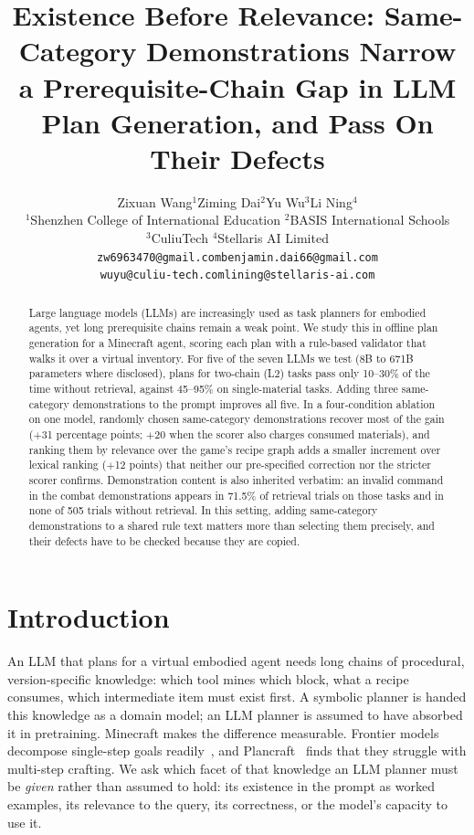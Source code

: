 \documentclass[letterpaper]{article} %
\title{Existence Before Relevance: Same-Category Demonstrations Narrow a
       Prerequisite-Chain Gap in LLM Plan Generation, and Pass On Their Defects}
\author{%
  Zixuan Wang$^{1}$\quad Ziming Dai$^{2}$\quad Yu Wu$^{3}$\quad Li Ning$^{4}$ \\
  $^{1}$Shenzhen College of International Education\quad
  $^{2}$BASIS International Schools \\
  $^{3}$CuliuTech\quad
  $^{4}$Stellaris AI Limited \\
  \texttt{\small zw6963470@gmail.com}\quad \texttt{\small benjamin.dai66@gmail.com} \\
  \texttt{\small wuyu@culiu-tech.com}\quad \texttt{\small lining@stellaris-ai.com}
}
\begin{document}
\maketitle

\begin{abstract}
Large language models (LLMs) are increasingly used as task planners for
embodied agents, yet long prerequisite chains remain a weak point.  We study
this in offline plan generation for a Minecraft agent, scoring each plan with
a rule-based validator that walks it over a virtual inventory.  For five of
the seven LLMs we test (8B to 671B parameters where disclosed), plans for
two-chain (L2) tasks pass only 10--30\% of the time without retrieval, against
45--95\% on single-material tasks.  Adding three same-category demonstrations
to the prompt improves all five.  In a four-condition ablation on one model,
randomly chosen same-category demonstrations recover most of the gain ($+$31
percentage points; $+$20 when the scorer also charges consumed materials), and
ranking them by relevance over the game's recipe graph adds a smaller increment
over lexical ranking ($+$12 points) that neither our pre-specified correction
nor the stricter scorer confirms.  Demonstration content is also inherited
verbatim: an invalid command in the combat demonstrations appears in 71.5\% of
retrieval trials on those tasks and in none of 505 trials without retrieval.
In this setting, adding same-category demonstrations to a shared rule text
matters more than selecting them precisely, and their defects have to be
checked because they are copied.
\end{abstract}

\section{Introduction}
\label{sec:intro}

An LLM that plans for a virtual embodied agent needs long chains of
procedural, version-specific knowledge:
which tool mines which block, what a recipe consumes, which intermediate item
must exist first.  A symbolic planner is handed this knowledge as a domain
model; an LLM planner is assumed to have absorbed it in pretraining.
Minecraft makes the difference measurable.  Frontier models decompose
single-step goals readily~\citep{wang2023voyager,wang2023describe}, and
Plancraft~\citep{dagan2024plancraft} finds that they struggle with multi-step
crafting.  We ask which facet of that knowledge an LLM planner must be
\emph{given} rather than assumed to hold: its existence in the prompt as worked examples, its
relevance to the query, its correctness, or the model's capacity to use it.
\end{document}
